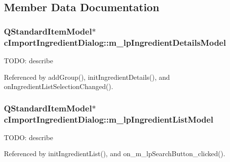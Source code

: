 \subsection{Member Data Documentation}
\subsubsection[{\texorpdfstring{m\+\_\+lp\+Ingredient\+Details\+Model}{m_lpIngredientDetailsModel}}]{\setlength{\rightskip}{0pt plus 5cm}Q\+Standard\+Item\+Model$\ast$ c\+Import\+Ingredient\+Dialog\+::m\+\_\+lp\+Ingredient\+Details\+Model\hspace{0.3cm}{\ttfamily [private]}}\hypertarget{classc_import_ingredient_dialog_a9fcdb59fa6c5fc9b65c4db1e43afb3db}{}\label{classc_import_ingredient_dialog_a9fcdb59fa6c5fc9b65c4db1e43afb3db}
T\+O\+DO\+: describe 

Referenced by add\+Group(), init\+Ingredient\+Details(), and on\+Ingredient\+List\+Selection\+Changed().

\subsubsection[{\texorpdfstring{m\+\_\+lp\+Ingredient\+List\+Model}{m_lpIngredientListModel}}]{\setlength{\rightskip}{0pt plus 5cm}Q\+Standard\+Item\+Model$\ast$ c\+Import\+Ingredient\+Dialog\+::m\+\_\+lp\+Ingredient\+List\+Model\hspace{0.3cm}{\ttfamily [private]}}\hypertarget{classc_import_ingredient_dialog_a0fe1def4e950a1f06a14f28ff7d9ba6a}{}\label{classc_import_ingredient_dialog_a0fe1def4e950a1f06a14f28ff7d9ba6a}
T\+O\+DO\+: describe 

Referenced by init\+Ingredient\+List(), and on\+\_\+m\+\_\+lp\+Search\+Button\+\_\+clicked().

